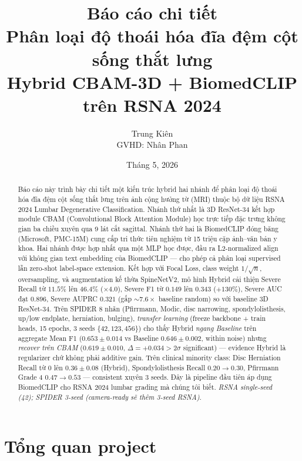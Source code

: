 \documentclass[11pt,a4paper]{article}
\title{\textbf{Báo cáo chi tiết}\\
       \large Phân loại độ thoái hóa đĩa đệm cột sống thắt lưng\\
       Hybrid CBAM-3D + BiomedCLIP trên RSNA 2024}
\author{Trung Kiên\\
        \small GVHD: Nh\^an Phan}
\date{Tháng 5, 2026}
\begin{document}
\maketitle

\begin{abstract}
\noindent Báo cáo này trình bày chi tiết một kiến trúc hybrid hai nhánh để
phân loại độ thoái hóa đĩa đệm cột sống thắt lưng trên ảnh cộng hưởng từ
(MRI) thuộc bộ dữ liệu RSNA 2024 Lumbar Degenerative Classification.
Nhánh thứ nhất là 3D ResNet-34 kết hợp module CBAM (Convolutional Block
Attention Module) học trực tiếp đặc trưng không gian ba chiều xuyên qua
9 lát cắt sagittal. Nhánh thứ hai là BiomedCLIP đóng băng (Microsoft,
PMC-15M) cung cấp tri thức tiên nghiệm từ 15 triệu cặp ảnh--văn bản y
khoa. Hai nhánh được hợp nhất qua một MLP học được, đầu ra L2-normalized
align với không gian text embedding của BiomedCLIP --- cho phép cả
phân loại supervised lẫn zero-shot label-space extension. Kết hợp với
Focal Loss, class weight $1/\sqrt{n}$, oversampling, và augmentation kế
thừa SpineNetV2, mô hình Hybrid cải thiện Severe Recall từ $11.5\%$
lên $46.4\%$ ($\times 4.0$), Severe F1 từ $0.149$ lên $0.343$
($+130\%$), Severe AUC đạt $0.896$, Severe AUPRC $0.321$ (gấp $\sim
7.6\times$ baseline random) so với baseline 3D ResNet-34. Trên SPIDER
8 nhãn (Pfirrmann, Modic, disc narrowing, spondylolisthesis, up/low
endplate, herniation, bulging), \emph{transfer learning} (freeze
backbone + train heads, 15 epochs, 3 seeds $\{42,123,456\}$) cho
thấy Hybrid \emph{ngang Baseline} trên aggregate Mean F1 ($0.653 \pm
0.014$ vs Baseline $0.646 \pm 0.002$, within noise) nhưng
\emph{recover trên CBAM} ($0.619 \pm 0.010$, $\Delta = +0.034 > 2\sigma$
significant) --- evidence Hybrid là regularizer chứ không phải additive
gain. Trên clinical minority class: Disc Herniation Recall từ $0$ lên
$0.36 \pm 0.08$ (Hybrid), Spondylolisthesis Recall $0.20 \to 0.30$,
Pfirrmann Grade 4 $0.47 \to 0.53$ --- consistent xuyên 3 seeds. Đây là
pipeline đầu tiên áp dụng BiomedCLIP cho RSNA 2024 lumbar grading mà
chúng tôi biết. \emph{RSNA single-seed (42); SPIDER 3-seed (camera-ready
sẽ thêm 3-seed RSNA)}.
\end{abstract}

\tableofcontents
\newpage

\section{Tổng quan project}
\end{document}
